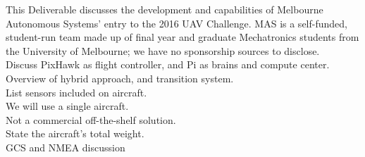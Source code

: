 \label{sec:intro}
This Deliverable discusses the development and capabilities of Melbourne Autonomous Systems' entry to the 2016 UAV Challenge. MAS is a self-funded, student-run team made up of final year and graduate Mechatronics students from the University of Melbourne; we have no sponsorship sources to disclose.\\

Discuss PixHawk as flight controller, and Pi as brains and compute center.\\

Overview of hybrid approach, and transition system.\\

List sensors included on aircraft.\\

We will use a single aircraft.\\

Not a commercial off-the-shelf solution.\\

State the aircraft's total weight.\\

GCS and NMEA discussion\\